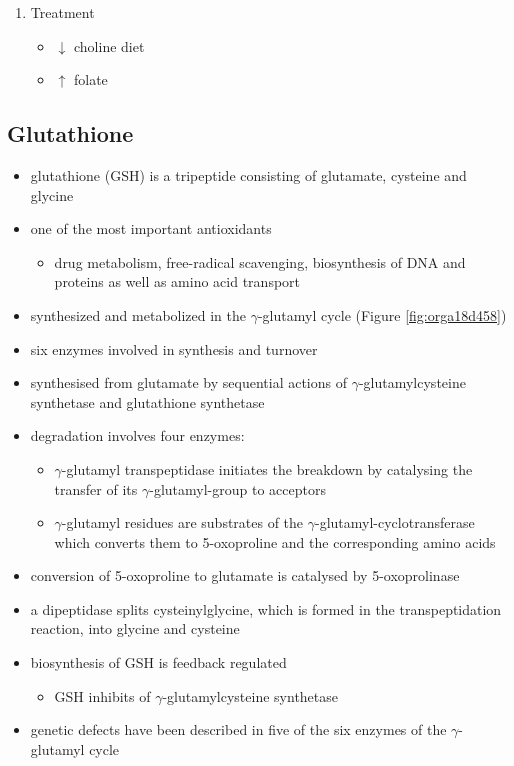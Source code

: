 \documentclass{scrartcl}
\begin{document}
\begin{enumerate}
\item Treatment
\label{sec:org47c07e3}
\begin{itemize}
\item \(\downarrow\) choline diet
\item \(\uparrow\) folate
\end{itemize}
\end{enumerate}

\subsection{Glutathione}
\label{sec:orgf46d955}
\begin{itemize}
\item glutathione (GSH) is a tripeptide consisting of glutamate, cysteine and glycine
\item one of the most important antioxidants
\begin{itemize}
\item drug metabolism, free-radical scavenging, biosynthesis of DNA and
proteins as well as amino acid transport
\end{itemize}
\item synthesized and metabolized in the \(\gamma\)-glutamyl cycle (Figure
\ref{fig:orga18d458})
\item six enzymes involved in synthesis and turnover
\item synthesised from glutamate by sequential actions of
\(\gamma\)-glutamylcysteine synthetase and glutathione
synthetase
\item degradation involves four enzymes:
\begin{itemize}
\item \(\gamma\)-glutamyl transpeptidase initiates the breakdown by
catalysing the transfer of its \(\gamma\)-glutamyl-group to
acceptors
\item \(\gamma\)-glutamyl residues are substrates of the
\(\gamma\)-glutamyl-cyclotransferase which converts them to
5-oxoproline and the corresponding amino acids
\end{itemize}
\item conversion of 5-oxoproline to glutamate is catalysed by
5-oxoprolinase
\item a dipeptidase splits cysteinylglycine, which is formed in the
transpeptidation reaction, into glycine and cysteine
\item biosynthesis of GSH is feedback regulated
\begin{itemize}
\item GSH inhibits of \(\gamma\)-glutamylcysteine synthetase
\end{itemize}
\item genetic defects have been described in five of the six enzymes of
the \(\gamma\)-glutamyl cycle
\end{itemize}
\end{document}

